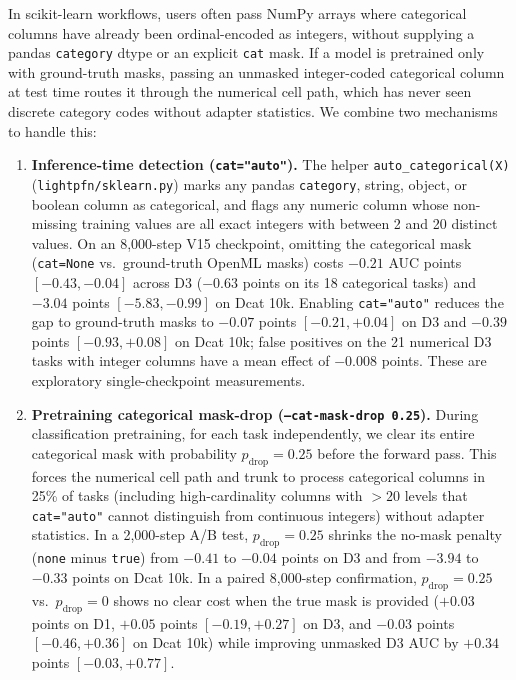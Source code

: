 \documentclass[11pt]{article}
\begin{document}
In scikit-learn workflows, users often pass NumPy arrays where categorical columns have already been ordinal-encoded as integers, without supplying a pandas \texttt{category} dtype or an explicit \texttt{cat} mask.
If a model is pretrained only with ground-truth masks, passing an unmasked integer-coded categorical column at test time routes it through the numerical cell path, which has never seen discrete category codes without adapter statistics.
We combine two mechanisms to handle this:
\begin{enumerate}
\item \textbf{Inference-time detection (\texttt{cat="auto"}).}
The helper \texttt{auto\_categorical(X)} (\texttt{lightpfn/sklearn.py}) marks any pandas \texttt{category}, string, object, or boolean column as categorical, and flags any numeric column whose non-missing training values are all exact integers with between 2 and 20 distinct values. %
On an 8,000-step V15 checkpoint, omitting the categorical mask (\texttt{cat=None} vs.\ ground-truth OpenML masks) costs $-0.21$ AUC points $[-0.43,-0.04]$ across D3 ($-0.63$ points on its 18 categorical tasks) and $-3.04$ points $[-5.83,-0.99]$ on Dcat 10k. %
Enabling \texttt{cat="auto"} reduces the gap to ground-truth masks to $-0.07$ points $[-0.21,+0.04]$ on D3 and $-0.39$ points $[-0.93,+0.08]$ on Dcat 10k; false positives on the 21 numerical D3 tasks with integer columns have a mean effect of $-0.008$ points. These are exploratory single-checkpoint measurements. %
\item \textbf{Pretraining categorical mask-drop (\texttt{--cat-mask-drop 0.25}).}
During classification pretraining, for each task independently, we clear its entire categorical mask with probability $p_{\text{drop}}=0.25$ before the forward pass. %
This forces the numerical cell path and trunk to process categorical columns in 25\% of tasks (including high-cardinality columns with $>20$ levels that \texttt{cat="auto"} cannot distinguish from continuous integers) without adapter statistics.
In a 2,000-step A/B test, $p_{\text{drop}}=0.25$ shrinks the no-mask penalty (\texttt{none} minus \texttt{true}) from $-0.41$ to $-0.04$ points on D3 and from $-3.94$ to $-0.33$ points on Dcat 10k. %
In a paired 8,000-step confirmation, $p_{\text{drop}}=0.25$ vs.\ $p_{\text{drop}}=0$ shows no clear cost when the true mask is provided ($+0.03$ points on D1, $+0.05$ points $[-0.19, +0.27]$ on D3, and $-0.03$ points $[-0.46, +0.36]$ on Dcat 10k) while improving unmasked D3 AUC by $+0.34$ points $[-0.03, +0.77]$. %
\end{enumerate}
\end{document}
